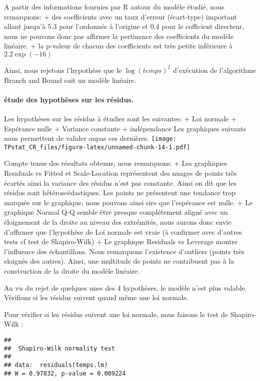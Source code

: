 \documentclass[
]{article}
\begin{document}
A partir des informations fournies par R autour du modèle étudié, nous
remarquons: + des coefficients avec un taux d'erreur (écart-type)
important allant jusqu'à 5.3 pour l'ordonnée à l'origine et 0.4 pour le
cofficient directeur, nous ne pouvons donc pas affirmer la pertinence
des coefficients du modèle linéaire. + la p-valeur de chacun des
coefficients est très petite inférieure à \(2.2\exp(-16)\)

Ainsi, nous rejetons l'hypothèse que le \(\log(temps)^2\) d'exécution de
l'algorithme Branch and Bound suit un modèle linéaire.

\hypertarget{uxe9tude-des-hypothuxe8ses-sur-les-ruxe9sidus.}{%
\paragraph{étude des hypothèses sur les
résidus.}\label{uxe9tude-des-hypothuxe8ses-sur-les-ruxe9sidus.}}

Les hypothèses sur les résidus à étudier sont les suivantes: + Loi
normale + Espérance nulle + Variance constante + indépendance Les
graphiques suivants nous permettent de valider oupas ces dernières.
\texttt{[image: TPstat\_CR\_files/figure-latex/unnamed-chunk-14-1.pdf]}

Compte tenue des résultats obtenus, nous remarquons: + Les graphiques
Residuals vs Fitted et Scale-Location représentent des nuages de points
très écartés ainsi la variance des résidus n'est pas constante. Ainsi on
dit que les résidus sont hétéroscédastiques. Les points ne présentent
une tendance trop marquée sur le graphique, nous pouvons ainsi sire que
l'espérance est nulle. + Le graphique Normal Q-Q semble être presque
complétement aligné avec un éloignement de la droite au niveau des
extrémités, nous aurons donc envie d'affirmer que l'hypothèse de Loi
normale est vraie (à confirmer avec d'autres tests cf test de
Shapiro-Wilk) + Le graphique Residuals vs Leverage montre l'influence
des échantillons. Nous remarquons l'existence d'outliers (points très
eloignés des autres). Ainsi, une multitude de points ne contribuent pas
à la construction de la droite du modèle linéaire.

Au vu du rejet de quelques unes des 4 hypothèses, le modèle n'est plus
valable. Vérifions si les résidus suivent quand même une loi normale.

Pour vérifier si les résidus suivent une loi normale, nous faisons le
test de Shapiro-Wilk :

\begin{verbatim}
## 
##  Shapiro-Wilk normality test
## 
## data:  residuals(temps.lm)
## W = 0.97832, p-value = 0.009224
\end{verbatim}
\end{document}

